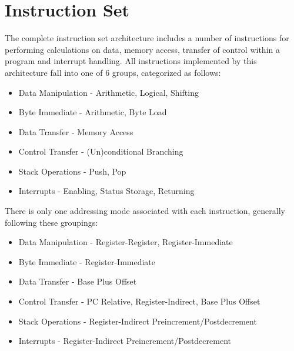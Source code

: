 
\newpage
\section{Instruction Set}

The complete instruction set architecture includes a number of instructions for performing calculations on data, memory access, transfer of control within a program and interrupt handling. 
\vspace{\baselineskip}
\noindent All instructions implemented by this architecture fall into one of 6 groups, categorized as follows:
\begin{itemize}
	\item Data Manipulation - Arithmetic, Logical, Shifting
	\item Byte Immediate - Arithmetic, Byte Load
	\item Data Transfer - Memory Access
	\item Control Transfer - (Un)conditional Branching
	\item Stack Operations - Push, Pop
	\item Interrupts - Enabling, Status Storage, Returning
\end{itemize}

\vspace{\baselineskip}
\noindent There is only one addressing mode associated with each instruction, generally following these groupings:
\begin{itemize}
	\item Data Manipulation - Register-Register, Register-Immediate
	\item Byte Immediate - Register-Immediate
	\item Data Transfer - Base Plus Offset
	\item Control Transfer - PC Relative, Register-Indirect, Base Plus Offset
	\item Stack Operations - Register-Indirect Preincrement/Postdecrement
	\item Interrupts - Register-Indirect Preincrement/Postdecrement
\end{itemize}
\vspace{\baselineskip}

